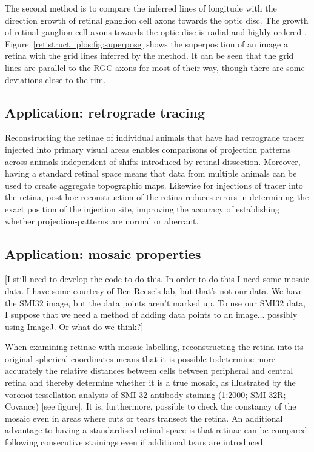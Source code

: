 \documentclass[10pt]{article}
\newcommand{\todo}[1]{{\color{red}[#1]}}
\begin{document}
The second method is to compare the inferred lines of longitude with
the direction growth of retinal ganglion cell axons towards the optic
disc.  The growth of retinal ganglion cell axons towards the optic
disc is radial and highly-ordered
\cite{ErskThom09intr}. Figure~\ref{retistruct_plos:fig:superpose}
shows the superposition of an image a retina \cite{KeelEtal11neur}
with the grid lines inferred by the method. It can be seen that the
grid lines are parallel to the RGC axons for most of their way, though
there are some deviations close to the rim.

\subsection*{Application: retrograde tracing}

Reconstructing the retinae of individual animals that have had
retrograde tracer injected into primary visual areas enables
comparisons of projection patterns across animals independent of
shifts introduced by retinal dissection. Moreover, having a standard
retinal space means that data from multiple animals can be used to
create aggregate topographic maps. Likewise for injections of tracer
into the retina, post-hoc reconstruction of the retina reduces errors
in determining the exact position of the injection site, improving the
accuracy of establishing whether projection-patterns are normal or
aberrant.

\subsection*{Application: mosaic properties}

\todo{I still need to develop the code to do this. In order to do this
  I need some mosaic data. I have some courtesy of Ben Reese's lab,
  but that's not our data. We have the SMI32 image, but the data points
  aren't marked up. To use our SMI32 data, I suppose that we need a
  method of adding data points to an image... possibly using ImageJ.
  Or what do we think?}

When examining retinae with mosaic labelling, reconstructing the
retina into its original spherical coordinates means that it is
possible todetermine more accurately the relative distances between
cells between peripheral and central retina and thereby determine
whether it is a true mosaic, as illustrated by the
voronoi-tessellation analysis of SMI-32 antibody staining (1:2000;
SMI-32R; Covance) \todo{see figure}. It is, furthermore, possible to
check the constancy of the mosaic even in areas where cuts or tears
transect the retina. An additional advantage to having a standardised
retinal space is that retinae can be compared following consecutive
stainings even if additional tears are introduced.
\end{document}
